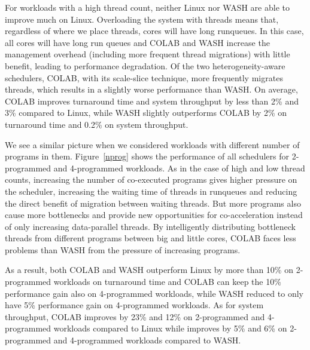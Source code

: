 For workloads with a high thread count, neither Linux nor WASH are able to improve much on Linux. Overloading the system with threads means that, regardless of where we place threads, cores will have long runqueues. 
In this case, all cores will have long run queues and COLAB and WASH increase the management overhead (including more frequent thread migrations) with little benefit, leading to performance degradation. Of the two heterogeneity-aware schedulers, COLAB, with its scale-slice technique, more frequently migrates threads, which results in a slightly worse performance than WASH. On average, COLAB improves turnaround time and system throughput by less than 2\% and 3\% compared to Linux, while WASH slightly outperforms COLAB by 2\% on turnaround time and 0.2\% on system throughput.

We see a similar picture when we considered workloads with different number of programs in them. Figure~\ref{nprog} shows the performance of all schedulers for 2-programmed and 4-programmed workloads. As in the case of high and low thread counts, increasing the number of co-executed programs gives higher pressure on the scheduler, increasing the waiting time of threads in runqueues and reducing the direct benefit of migration between waiting threads. But more programs also cause more bottlenecks and provide new opportunities for co-acceleration instead of only increasing data-parallel threads. 
By intelligently distributing bottleneck threads from different programs between big and little cores, COLAB faces less problems than WASH from the pressure of increasing programs. 

As a result, both COLAB and WASH outperform Linux by more than 10\% on 2-programmed workloads on turnaround time and COLAB can keep the 10\% performance gain also on 4-programmed workloads, while WASH reduced to only have 5\% performance gain on 4-programmed workloads. As for system throughput, COLAB improves by 23\% and 12\% on 2-programmed and 4-programmed workloads compared to Linux while improves by 5\% and 6\% on 2-programmed and 4-programmed workloads compared to WASH. 


